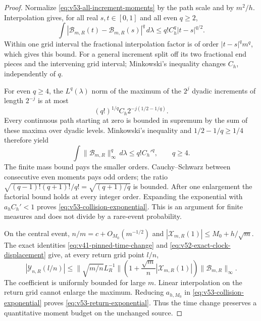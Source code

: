 \begin{proof}
Normalize \eqref{eq:v53-all-increment-moments} by the path scale and
by $m^2/h$. Interpolation gives, for all real $s,t\in[0,1]$ and
all even $q\ge2$,
\[
 \int|\mathcal B_{m,R}(t)-\mathcal B_{m,R}(s)|^q\,d\lambda
                         \le q!C_h^q|t-s|^{q/2}.
\]
Within one grid interval the fractional interpolation factor is of
order $|t-s|^q m^q$, which gives this bound. For a general increment
split off its two fractional end pieces and the intervening grid
interval; Minkowski's inequality changes $C_h$, independently of $q$.

For even $q\ge4$, the $L^q(\lambda)$ norm of the maximum of the
$2^j$ dyadic increments of length $2^{-j}$ is at most
\[
 (q!)^{1/q}C_h2^{-j(1/2-1/q)}.
\]
Every continuous path starting at zero is bounded in supremum by the
sum of these maxima over dyadic levels. Minkowski's inequality and
$1/2-1/q\ge1/4$ therefore yield
\[
 \int\|\mathcal B_{m,R}\|_\infty^q\,d\lambda\le q!C_h'^q,
                                                        \qquad q\ge4.
\]
The finite mass bound pays the smaller orders. Cauchy--Schwarz between
consecutive even moments pays odd orders; the ratio
$\sqrt{(q-1)!(q+1)!}/q!=\sqrt{(q+1)/q}$ is bounded.
After one enlargement the factorial bound holds at every integer
order. Expanding the exponential with $a_hC_h'<1$ proves
\eqref{eq:v53-collision-exponential}. This is an argument for finite
measures and does not divide by a rare-event probability.

On the central event, $n/m=c+O_{M_0}(m^{-1/2})$ and
$|\mathcal X_{m,R}(1)|\le M_0+h/\sqrt m$. The exact identities
\eqref{eq:v41-pinned-time-change} and
\eqref{eq:v52-exact-clock-displacement} give, at every return grid
point $l/n$,
\[
 |\mathcal Y_{n,R}(l/n)|
 \le\|\sqrt{m/n}L_R^{-1}\|
       \left(1+\frac{\sqrt m}{n}|\mathcal X_{m,R}(1)|\right)
                                     \|\mathcal B_{m,R}\|_\infty.
\]
The coefficient is uniformly bounded for large $m$. Linear
interpolation on the return grid cannot enlarge the maximum.
Reducing $a_{h,M_0}$ in \eqref{eq:v53-collision-exponential}
proves \eqref{eq:v53-return-exponential}. Thus the time change
preserves a quantitative moment budget on the unchanged source.
\end{proof}

